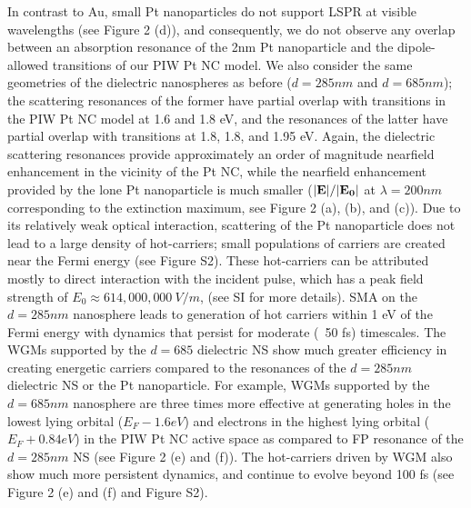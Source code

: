 \documentclass[journal=jpclcd,manuscript=letter]{achemso}
\begin{document}
In contrast to Au, small Pt nanoparticles do not support LSPR at visible wavelengths (see Figure 2 (d)), and consequently, we do not
observe any overlap between an absorption resonance of the 2nm Pt nanoparticle and the dipole-allowed 
transitions of our PIW Pt NC model.  We also consider
the same geometries of the dielectric nanospheres as before ($d=285nm$ and $d=685 nm$); the scattering resonances of the former have partial overlap with transitions in the PIW Pt NC model at 1.6 and 1.8 eV, and the resonances of the latter have partial 
overlap with transitions at 1.8, 1.8, and 1.95 eV.  Again, the dielectric scattering resonances provide 
approximately an order of magnitude 
nearfield enhancement in the vicinity of the Pt NC, while the nearfield enhancement provided by the lone 
Pt nanoparticle is much smaller ($|{\bf E}|/|{\bf E_0}|$ at $\lambda=200nm$ corresponding to the extinction maximum, see Figure 2 (a), (b), and (c)).
Due to its relatively weak optical interaction, scattering of the Pt nanoparticle does not lead to a large density of hot-carriers; small populations
of carriers are created near the Fermi energy (see Figure S2).  These hot-carriers can be attributed mostly to direct interaction with the 
incident pulse, which has a peak field strength of $E_0 \approx 614,000,000 \: V/m$, (see SI for more details).
SMA on the $d=285nm$ nanosphere
leads to generation of hot carriers within 1 eV of the Fermi energy with dynamics that persist for moderate (~50 fs) timescales.
The WGMs supported by the $d=685$ dielectric NS show much greater efficiency in creating energetic carriers compared
to the resonances of the $d=285nm$ dielectric NS or the Pt nanoparticle.  For example, WGMs supported by the $d=685nm$ nanosphere are three times
more effective at generating holes in the lowest lying orbital ($E_F - 1.6 eV$) 
and electrons in the highest 
lying orbital ($E_F + 0.84 eV$) in the PIW Pt NC active space as compared to FP resonance of the $d=285nm$ NS (see Figure 2 (e) and (f)).  
The hot-carriers driven by WGM also show much more persistent dynamics, and continue to evolve beyond 100 fs (see Figure 2 (e) and (f) and Figure S2).
\end{document}

